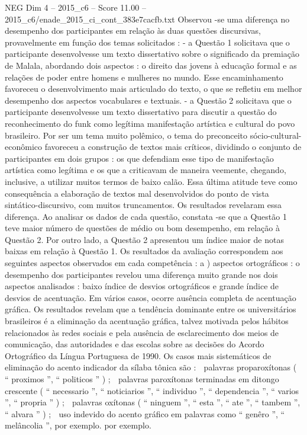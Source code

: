 \begin{textsample}{NEG Dim 4 – 2015\_c6 – Score 11.00 – 2015\_c6/enade\_2015\_ci\_cont\_383e7cacfb.txt}
Observou -se uma diferença no desempenho dos participantes em relação às duas questões discursivas, provavelmente em função dos temas solicitados : - a Questão 1 solicitava que o participante desenvolvesse um texto dissertativo sobre o significado da premiação de Malala, abordando dois aspectos : o direito das jovens à educação formal e as relações de poder entre homens e mulheres no mundo.
Esse encaminhamento favoreceu o desenvolvimento mais articulado do texto, o que se refletiu em melhor desempenho dos aspectos vocabulares e textuais. - a Questão 2 solicitava que o participante desenvolvesse um texto dissertativo para discutir a questão do reconhecimento do funk como legítima manifestação artística e cultural do povo brasileiro.
Por ser um tema muito polêmico, o tema do preconceito sócio-cultural-econômico favoreceu a construção de textos mais críticos, dividindo o conjunto de participantes em dois grupos : os que defendiam esse tipo de manifestação artística como legítima e os que a criticavam de maneira veemente, chegando, inclusive, a utilizar muitos termos de baixo calão.
Essa última atitude teve como consequência a elaboração de textos mal desenvolvidos do ponto de vista sintático-discursivo, com muitos truncamentos.
Os resultados revelaram essa diferença.
Ao analisar os dados de cada questão, constata -se que a Questão 1 teve maior número de questões de médio ou bom desempenho, em relação à Questão 2.
Por outro lado, a Questão 2 apresentou um índice maior de notas baixas em relação à Questão 1.
Os resultados da avaliação correspondem aos seguintes aspectos observados em cada competência : a ) aspectos ortográficos : o desempenho dos participantes revelou uma diferença muito grande nos dois aspectos analisados : baixo índice de desvios ortográficos e grande índice de desvios de acentuação.
Em vários casos, ocorre ausência completa de acentuação gráfica.
Os resultados revelam que a tendência dominante entre os universitários brasileiros é a eliminação da acentuação gráfica, talvez motivada pelos hábitos relacionados às redes sociais e pela ausência de esclarecimento dos meios de comunicação, das autoridades e das escolas sobre as decisões do Acordo Ortográfico da Língua Portuguesa de 1990.
Os casos mais sistemáticos de eliminação do acento indicador da sílaba tônica são :  palavras proparoxítonas ( “ proximos ”, “ politicos ” ) ;  palavras paroxítonas terminadas em ditongo crescente ( “ necessario ”, “ noticiarios ”, “ individuo ”, “ dependencia ”, “ varios ”, “ propria ” ) ;  palavras oxítonas ( “ ninguem ”, “ esta ”, “ ate ”, “ tambem ”, “ alvara ” ) ;  uso indevido do acento gráfico em palavras como “ genêro ”, “ melâncolia ”, por exemplo. por exemplo.

\end{textsample}

